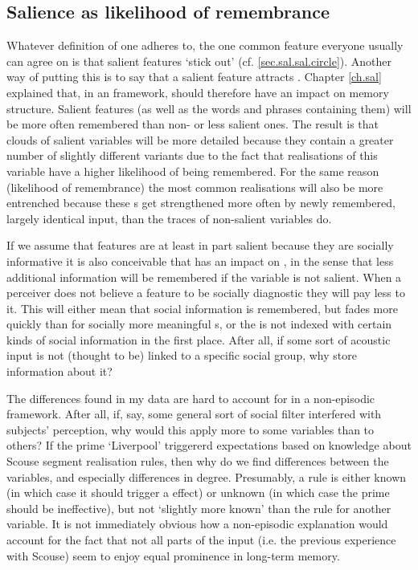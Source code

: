 		\subsection{Salience as likelihood of remembrance}

Whatever definition of  one adheres to, the one common feature everyone usually can agree on is that salient features `stick out' (cf. \ref{sec.sal.sal.circle}).
Another way of putting this is to say that a salient feature attracts .
Chapter \ref{ch.sal} explained that, in an  framework,  should therefore have an impact on memory structure.
Salient features (as well as the words and phrases containing them) will be more often remembered than non- or less salient ones.
The result is that  clouds of salient variables will be more detailed because they contain a greater number of slightly different variants due to the fact that realisations of this variable have a higher likelihood of being remembered.
For the same reason (likelihood of remembrance) the most common realisations will also be more entrenched because these s get strengthened more often by newly remembered, largely identical input, than the traces of non-salient variables do.

If we assume that features are at least in part salient because they are socially informative it is also conceivable that  has an impact on , in the sense that less additional information will be remembered if the variable is not salient.
When a perceiver does not believe a feature to be socially diagnostic they will pay less  to it.
This will either mean that social information is remembered, but fades more quickly than for socially more meaningful s, or the  is not indexed with certain kinds of social information in the first place.
After all, if some sort of acoustic input is not (thought to be) linked to a specific social group, why store information about it?

The  differences found in my data are hard to account for in a non-episodic framework.
After all, if, say, some general sort of social filter \parencite[cf.][]{niedzielski1999} interfered with subjects' perception, why would this apply more to some variables than to others?
If the prime \enquote*{Liverpool} triggererd expectations based on knowledge about Scouse segment realisation rules, then why do we find differences between the variables, and especially differences in degree.
Presumably, a rule is either known (in which case it should trigger a  effect) or unknown (in which case the prime should be ineffective), but not \enquote*{slightly more known} than the rule for another variable.
It is not immediately obvious how a non-episodic explanation would account for the fact that not all parts of the input (i.e. the previous experience with Scouse) seem to enjoy equal prominence in long-term memory.

